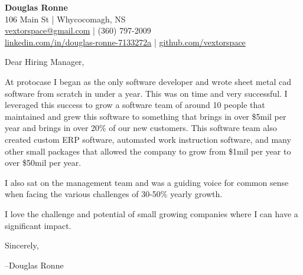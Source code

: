 \documentclass[letter,12pt]{article}
\begin{document}
\begin{center}
    {\Huge \textbf{Douglas Ronne}}\\
    \vspace{2mm}
    106 Main St | Whycocomagh, NS\\
    \href{mailto:vextorspace@gmail.com}{vextorspace@gmail.com} | (360) 797-2009\\
    \href{www.linkedin.com/in/douglas-ronne-7133272a}{linkedin.com/in/douglas-ronne-7133272a} | \href{https://github.com/vextorspace}{github.com/vextorspace}
\end{center}

Dear Hiring Manager,

\vspace{.5cm}
\noindent
At protocase I began as the only software developer and wrote sheet metal cad software from scratch in under a year. This was on time and very successful. I leveraged this success to grow a software team of around 10 people that maintained and grew this software to something that brings in over \$5mil per year and brings in over 20\% of our new customers. This software team also created custom ERP software, automated work instruction software, and many other small packages that allowed the company to grow from \$1mil per year to over \$50mil per year.

\vspace{.5cm}
\noindent
I also sat on the management team and was a guiding voice for common sense when facing the various challenges of 30-50\% yearly growth.

\vspace{.5cm}
\noindent
I love the challenge and potential of small growing companies where I can have a significant impact.

\vspace{1cm}
\noindent
Sincerely,

\noindent
--Douglas Ronne
\end{document}
